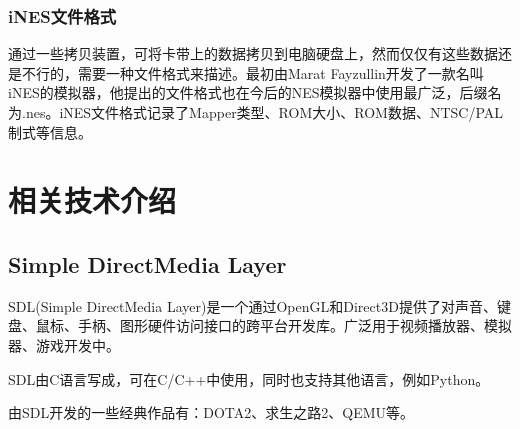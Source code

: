 \documentclass[a4paper]{ltxdoc}
\begin{document}
{\subsubsection{iNES文件格式}
通过一些拷贝装置，可将卡带上的数据拷贝到电脑硬盘上，然而仅仅有这些数据还是不行的，需要一种文件格式来描述。最初由Marat Fayzullin开发了一款名叫iNES的模拟器，他提出的文件格式也在今后的NES模拟器中使用最广泛，后缀名为.nes。iNES文件格式记录了Mapper类型、ROM大小、ROM数据、NTSC/PAL制式等信息。

\section{相关技术介绍}
\subsection{Simple DirectMedia Layer}
SDL(Simple DirectMedia Layer)是一个通过OpenGL和Direct3D提供了对声音、键盘、鼠标、手柄、图形硬件访问接口的跨平台开发库。广泛用于视频播放器、模拟器、游戏开发中。

SDL由C语言写成，可在C/C++中使用，同时也支持其他语言，例如Python。

由SDL开发的一些经典作品有：DOTA2、求生之路2、QEMU等。

}
\end{document}
